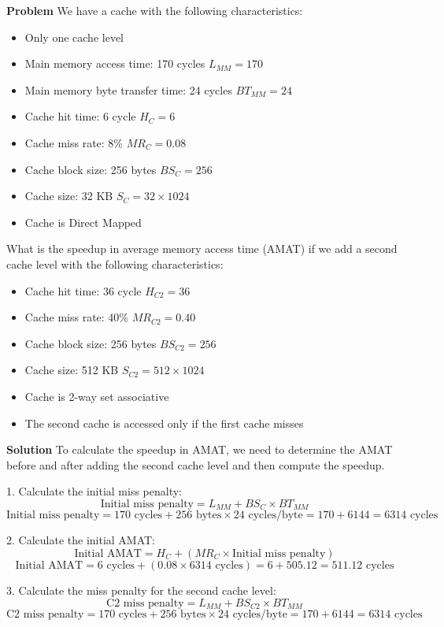 \textbf{Problem}
We have a cache with the following characteristics:
\begin{itemize}
    \item Only one cache level
    \item Main memory access time: 170 cycles $L_{MM}=170$
    \item Main memory byte transfer time: 24 cycles $BT_{MM}=24$
    \item Cache hit time: 6 cycle $H_{C}=6$
    \item Cache miss rate: 8\% $MR_{C}=0.08$
    \item Cache block size: 256 bytes $BS_{C}=256$
    \item Cache size: 32 KB $S_{C}=32 \times 1024$
    \item Cache is Direct Mapped
\end{itemize}

What is the speedup in average memory access time (AMAT) if we add a second cache level with the following characteristics:
\begin{itemize}
    \item Cache hit time: 36 cycle $H_{C2}=36$
    \item Cache miss rate: 40\% $MR_{C2}=0.40$
    \item Cache block size: 256 bytes $BS_{C2}=256$
    \item Cache size: 512 KB $S_{C2}=512 \times 1024$
    \item Cache is 2-way set associative
    \item The second cache is accessed only if the first cache misses
\end{itemize}

\textbf{Solution}
To calculate the speedup in AMAT, we need to determine the AMAT before and after adding the second cache level and then compute the speedup.

1. Calculate the initial miss penalty:
\[
\text{Initial miss penalty} = L_{MM} + BS_{C} \times BT_{MM}
\]
\[
\text{Initial miss penalty} = 170 \text{ cycles} + 256 \text{ bytes} \times 24 \text{ cycles/byte} = 170 + 6144 = 6314 \text{ cycles}
\]

2. Calculate the initial AMAT:
\[
\text{Initial AMAT} = H_{C} + (MR_{C} \times \text{Initial miss penalty})
\]
\[
\text{Initial AMAT} = 6 \text{ cycles} + (0.08 \times 6314 \text{ cycles}) = 6 + 505.12 = 511.12 \text{ cycles}
\]

3. Calculate the miss penalty for the second cache level:
\[
\text{C2 miss penalty} = L_{MM} + BS_{C2} \times BT_{MM}
\]
\[
\text{C2 miss penalty} = 170 \text{ cycles} + 256 \text{ bytes} \times 24 \text{ cycles/byte} = 170 + 6144 = 6314 \text{ cycles}
\]

